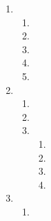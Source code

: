 \begin{enumerate}
\begin{enumerate}
      \item 

      \item 

    \end{enumerate}

  \item

    \begin{enumerate}

      \item 

      \item 

      \item 

      \item 

      \item 

    \end{enumerate}

    \setcounter{enumi}{5}

  \item

    \begin{enumerate}

      \item 

      \item 

      \item 

        \begin{enumerate}

          \item 

          \item 

          \item 

          \item 

        \end{enumerate}

    \end{enumerate}

    \setcounter{enumi}{7}

  \item

    \begin{enumerate}

      \item 


\end{enumerate}
\end{enumerate}
